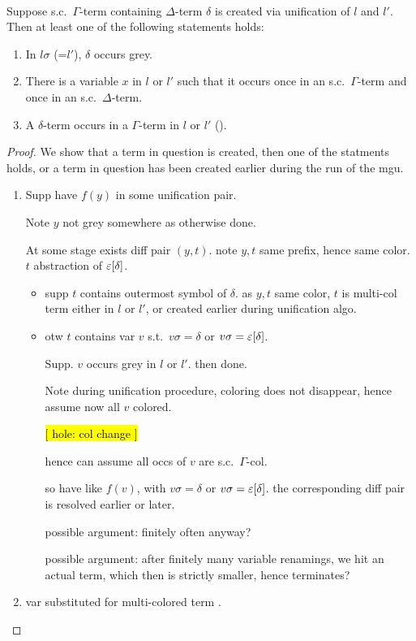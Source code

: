 \documentclass[,%
	paper=a4,%
	DIV11, %
	twoside=false,%
	liststotoc,
	bibtotoc,
	draft=false,%
	numbers=noendperiod
]{scrartcl}
\begin{document}
~

\clearpage
\begin{clemma}
	Suppose s.c.\ $\Gamma$-term containing $\Delta$-term $\delta$ is created via unification of $l$ and $l'$.
	Then at least one of the following statements holds:
	\begin{enumerate}
		\item In $l\sigma$	(=$l'$), $\delta$ occurs grey.
		\item There is a variable $x$ in $l$ or $l'$ such that it occurs once in an s.c.\ $\Gamma$-term and once in an s.c.\ $\Delta$-term.
		\item A $\delta$-term occurs in a $\Gamma$-term in $l$ or $l'$ ().
	\end{enumerate}
\end{clemma}
\begin{proof}
	We show that a term in question is created, then one of the statments holds, or a term in question has been created earlier during the run of the mgu.

	\begin{enumerate}
		\item
			Supp have $f(y)$ in some unification pair.

			Note $y$ not grey somewhere as otherwise done.

			At some stage exists diff pair $(y, t)$. note $y, t$ same prefix, hence same color.
			$t$ abstraction of $\varepsilon[\delta]$.

			\begin{itemize}
				\item supp $t$ contains outermost symbol of $\delta$. as $y, t$ same color, $t$ is multi-col term either in $l$ or $l'$, or created earlier during unification algo.
				\item otw $t$ contains var $v$ s.t.\ $v\sigma = \delta$ or $v\sigma = \varepsilon[\delta]$.

					Supp. $v$ occurs grey in $l$ or $l'$. then done. 

					Note during unification procedure, coloring does not disappear, hence assume now all $v$ colored.

					\hl{[ hole: col change ]}

					hence can assume all occs of $v$ are s.c.\ $\Gamma$-col.

					so have like $f(v)$, with $v\sigma = \delta$ or $v\sigma = \varepsilon[\delta]$.
					the corresponding diff pair is resolved earlier or later.

					possible argument: finitely often anyway? 

					possible argument: after finitely many variable renamings, we hit an actual term, which then is strictly smaller, hence terminates?

			\end{itemize}

		\item var substituted for multi-colored term .
	\end{enumerate}

\end{proof}
\end{document}
